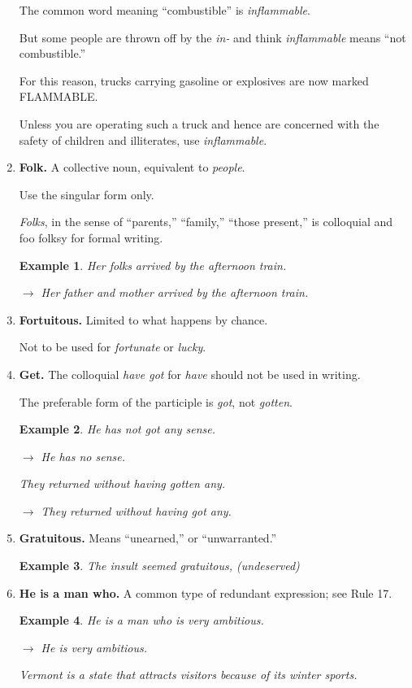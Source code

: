 \documentclass{article}
\newtheorem{example}{Example}
\begin{document}
\begin{enumerate}
	The common word meaning ``combustible'' is {\it inflammable}.
	
	But some people are thrown off by the {\it in-} and think {\it inflammable} means ``not combustible.''
	
	For this reason, trucks carrying gasoline or explosives are now marked FLAMMABLE.
	
	Unless you are operating such a truck and hence are concerned with the safety of children and illiterates, use {\it inflammable}.
	\item {\bf Folk.} A collective noun, equivalent to {\it people}.
	
	Use the singular form only.
	
	{\it Folks}, in the sense of ``parents,'' ``family,'' ``those present,'' is colloquial and foo folksy for formal writing.
	\begin{example}
		Her folks arrived by the afternoon train.
		
		$\to$ Her father and mother arrived by the afternoon train.
	\end{example}
	\item {\bf Fortuitous.} Limited to what happens by chance.
	
	Not to be used for {\it fortunate} or {\it lucky}.
	\item {\bf Get.} The colloquial {\it have got} for {\it have} should not be used in writing.
	
	The preferable form of the participle is {\it got}, not {\it gotten}.
	\begin{example}
		He has not got any sense.
		
		$\to$ He has no sense.
		
		They returned without having gotten any.
		
		$\to$ They returned without having got any.
	\end{example}
	\item {\bf Gratuitous.} Means ``unearned,'' or ``unwarranted.''
	\begin{example}
		The insult seemed gratuitous, (undeserved)
	\end{example}
	\item {\bf He is a man who.} A common type of redundant expression; see Rule 17.
	\begin{example}
		He is a man who is very ambitious.
		
		$\to$ He is very ambitious.
		
		Vermont is a state that attracts visitors because of its winter sports.
		

\end{example}
\end{enumerate}
\end{document}
